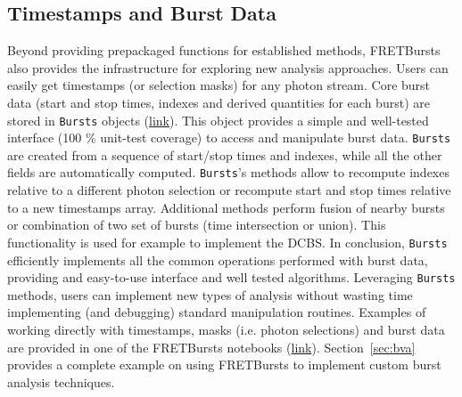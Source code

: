 \subsection{Timestamps and Burst Data}
\label{sec:burststimes}

Beyond providing prepackaged functions for established methods,
FRETBursts also provides the infrastructure for exploring new analysis approaches.
Users can easily get timestamps (or selection masks) for any photon stream.
Core burst data (start and stop times, indexes
and derived quantities for each burst) are stored in \verb|Bursts| objects
(\href{http://fretbursts.readthedocs.org/en/latest/burstsearch.html}{link}).
This object provides a simple and well-tested interface (100 \% unit-test coverage)
to access and manipulate burst data. \verb|Bursts| are created from a sequence of start/stop
times and indexes, while all the other fields are automatically
computed. \verb|Bursts|'s methods allow to recompute indexes relative to a different photon
selection or recompute start and stop times relative to a new timestamps array.
Additional methods perform fusion of nearby bursts or combination of two set of bursts
(time intersection or union). This functionality is used for example to implement
the DCBS.
In conclusion, \verb|Bursts| efficiently implements all the common operations performed
with burst data, providing and easy-to-use interface and well tested algorithms.
Leveraging \verb|Bursts| methods, users can implement new types of analysis without
wasting time implementing (and debugging) standard manipulation routines.
Examples of working directly with timestamps, masks (i.e. photon selections) and
burst data are provided in one of the FRETBursts notebooks (\href{http://nbviewer.jupyter.org/github/tritemio/FRETBursts_notebooks/blob/master/notebooks/Example%20-%20Working%20with%20timestamps%20and%20bursts.ipynb}{link}).
Section~\ref{sec:bva} provides a complete example on using FRETBursts to implement 
custom burst analysis techniques.

